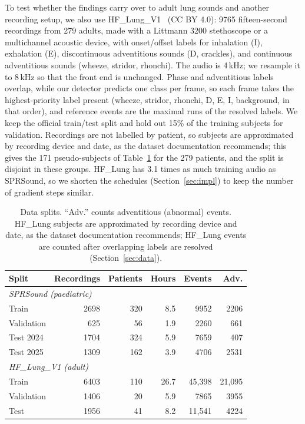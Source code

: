 To test whether the findings carry over to adult lung sounds and another recording setup, we also use HF\_Lung\_V1~\cite{hsu2021benchmarking} (CC BY 4.0): 9765 fifteen-second recordings from 279 adults, made with a Littmann 3200 stethoscope or a multichannel acoustic device, with onset/offset labels for inhalation (I), exhalation (E), discontinuous adventitious sounds (D, crackles), and continuous adventitious sounds (wheeze, stridor, rhonchi). The audio is 4\,kHz; we resample it to 8\,kHz so that the front end is unchanged. Phase and adventitious labels overlap, while our detector predicts one class per frame, so each frame takes the highest-priority label present (wheeze, stridor, rhonchi, D, E, I, background, in that order), and reference events are the maximal runs of the resolved labels. We keep the official train/test split and hold out 15\% of the training subjects for validation. Recordings are not labelled by patient, so subjects are approximated by recording device and date, as the dataset documentation recommends; this gives the 171 pseudo-subjects of Table~\ref{tab:data} for the 279 patients, and the split is disjoint in these groups. HF\_Lung has 3.1 times as much training audio as SPRSound, so we shorten the schedules (Section~\ref{sec:impl}) to keep the number of gradient steps similar.

\begin{table}[H]
\caption{Data splits. ``Adv.'' counts adventitious (abnormal) events. HF\_Lung subjects are approximated by recording device and date, as the dataset documentation recommends; HF\_Lung events are counted after overlapping labels are resolved (Section~\ref{sec:data}).}
\label{tab:data}
\centering
\setlength{\tabcolsep}{3.5pt}
\begin{tabular}{lrrrrr}
\toprule
\textbf{Split} & \textbf{Recordings} & \textbf{Patients} & \textbf{Hours} & \textbf{Events} & \textbf{Adv.} \\
\midrule
\multicolumn{6}{l}{\textit{SPRSound (paediatric)}} \\
Train & 2698 & 320 & 8.5 & 9952 & 2206 \\
Validation & 625 & 56 & 1.9 & 2260 & 661 \\
Test 2024 & 1704 & 324 & 5.9 & 7659 & 407 \\
Test 2025 & 1309 & 162 & 3.9 & 4706 & 2531 \\
\midrule
\multicolumn{6}{l}{\textit{HF\_Lung\_V1 (adult)}} \\
Train & 6403 & 110 & 26.7 & 45,398 & 21,095 \\
Validation & 1406 & 20 & 5.9 & 7865 & 3955 \\
Test & 1956 & 41 & 8.2 & 11,541 & 4224 \\
\bottomrule
\end{tabular}
\end{table}

